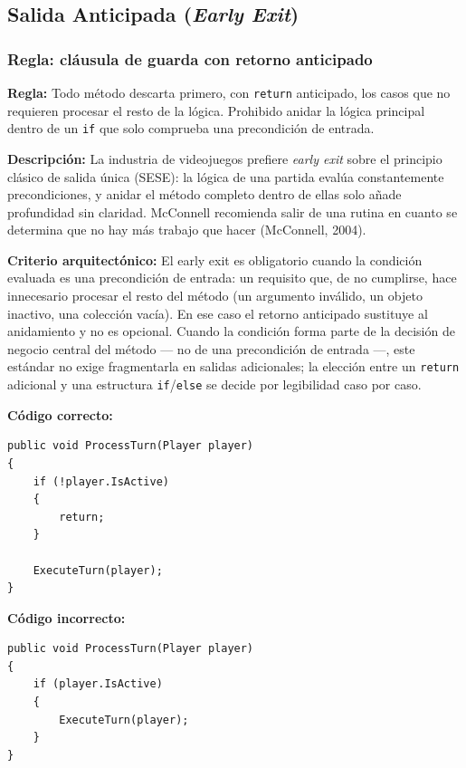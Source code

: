 \subsection{Salida Anticipada (\emph{Early Exit})}

\subsubsection{Regla: cláusula de guarda con retorno anticipado}

\textbf{Regla:} Todo método descarta primero, con \texttt{return} anticipado, los casos que no requieren procesar el resto de la lógica. Prohibido anidar la lógica principal dentro de un \texttt{if} que solo comprueba una precondición de entrada.

\textbf{Descripción:} La industria de videojuegos prefiere \emph{early exit} sobre el principio clásico de salida única (SESE): la lógica de una partida evalúa constantemente precondiciones, y anidar el método completo dentro de ellas solo añade profundidad sin claridad. McConnell recomienda salir de una rutina en cuanto se determina que no hay más trabajo que hacer (McConnell, 2004).

\textbf{Criterio arquitectónico:} El early exit es obligatorio cuando la condición evaluada es una precondición de entrada: un requisito que, de no cumplirse, hace innecesario procesar el resto del método (un argumento inválido, un objeto inactivo, una colección vacía). En ese caso el retorno anticipado sustituye al anidamiento y no es opcional. Cuando la condición forma parte de la decisión de negocio central del método --- no de una precondición de entrada ---, este estándar no exige fragmentarla en salidas adicionales; la elección entre un \texttt{return} adicional y una estructura \texttt{if}/\texttt{else} se decide por legibilidad caso por caso.

\textbf{Código correcto:}
\begin{lstlisting}[style=csharpstyle]
public void ProcessTurn(Player player)
{
    if (!player.IsActive)
    {
        return;
    }

    ExecuteTurn(player);
}
\end{lstlisting}

\textbf{Código incorrecto:}
\begin{lstlisting}[style=csharpstyle]
public void ProcessTurn(Player player)
{
    if (player.IsActive)
    {
        ExecuteTurn(player);
    }
}
\end{lstlisting}

